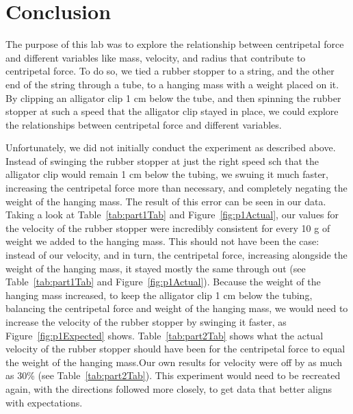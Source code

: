 
\section{Conclusion}

\vspace{-0.5cm}
\singlespacing

The purpose of this lab was to explore the relationship between centripetal force and different variables like mass, velocity, and radius that contribute to centripetal force. To do so, we tied a rubber stopper to a string, and the other end of the string through a tube, to a hanging mass with a weight placed on it. By clipping an alligator clip 1 cm below the tube, and then spinning the rubber stopper at such a speed that the alligator clip stayed in place, we could explore the relationships between centripetal force and different variables.

Unfortunately, we did not initially conduct the experiment as described above. Instead of swinging the rubber stopper at just the right speed sch that the alligator clip would remain 1 cm below the tubing, we swuing it much faster, increasing the centripetal force more than necessary, and completely negating the weight of the hanging mass. The result of this error can be seen in our data. Taking a look at Table~\ref{tab:part1Tab} and Figure~\ref{fig:p1Actual}, our values for the velocity of the rubber stopper were incredibly consistent for every 10 g of weight we added to the hanging mass. This should not have been the case: instead of our velocity, and in turn, the centripetal force, increasing alongside the weight of the hanging mass, it stayed mostly the same through out (see Table~\ref{tab:part1Tab} and Figure~\ref{fig:p1Actual}). Because the weight of the hanging mass increased, to keep the alligator clip 1 cm below the tubing, balancing the centripetal force and weight of the hanging mass, we would need to increase the velocity of the rubber stopper by swinging it faster, as Figure~\ref{fig:p1Expected} shows. Table~\ref{tab:part2Tab} shows what the actual velocity of the rubber stopper should have been for the centripetal force to equal the weight of the hanging mass.Our own results for velocity were off by as much as 30\% (see Table~\ref{tab:part2Tab}). This experiment would need to be recreated again, with the directions followed more closely, to get data that better aligns with expectations.

